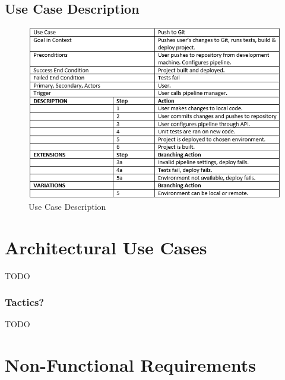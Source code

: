    \subsection{Use Case Description}
   \begin{figure}[H]
       \includegraphics[width = 1.2\linewidth]{diagrams/DetailedUseCase}
       \caption{Use Case Description}
       \label{fig:use_case_description}
     \end{figure}    


\section{Architectural Use Cases}
TODO

\subsubsection{Tactics?}
TODO


\section{Non-Functional Requirements}

